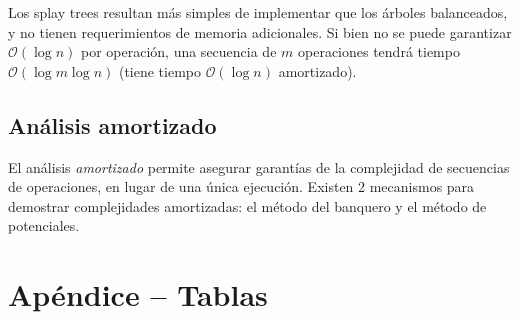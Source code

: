 \documentclass{article}
\newcommand{\BigO}[1]{{\mathcal{O}(#1)}}
\begin{document}
Los splay trees resultan más simples de implementar que los árboles balanceados, y no tienen requerimientos de memoria adicionales. Si bien no se puede garantizar $\BigO{\log{n}}$ por operación, una secuencia de $m$ operaciones tendrá tiempo $\BigO{\log{m\log{n}}}$ (tiene tiempo $\BigO{\log{n}}$ amortizado).

\subsection{Análisis amortizado}

El análisis \textit{amortizado} permite asegurar garantías de la complejidad de secuencias de operaciones, en lugar de una única ejecución. Existen 2 mecanismos para demostrar complejidades amortizadas: el método del banquero y el método de potenciales.




\appendix

\section{Apéndice -- Tablas}



\label{table-dict-complexities}
\end{document}
